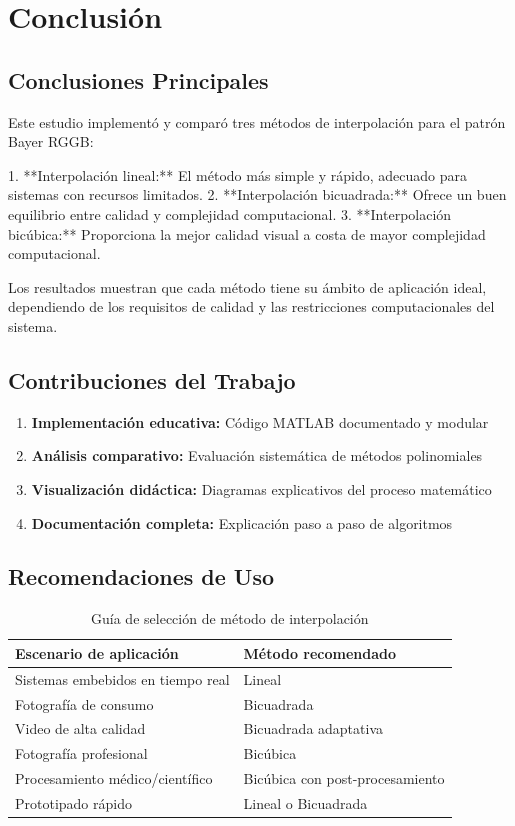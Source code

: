 \section{Conclusión}\label{sec:conclusion}

\subsection{Conclusiones Principales}

Este estudio implementó y comparó tres métodos de interpolación para el patrón Bayer RGGB:

1. **Interpolación lineal:** El método más simple y rápido, adecuado para sistemas con recursos limitados.
2. **Interpolación bicuadrada:** Ofrece un buen equilibrio entre calidad y complejidad computacional.
3. **Interpolación bicúbica:** Proporciona la mejor calidad visual a costa de mayor complejidad computacional.

Los resultados muestran que cada método tiene su ámbito de aplicación ideal, dependiendo de los requisitos de calidad y las restricciones computacionales del sistema.

\subsection{Contribuciones del Trabajo}

\begin{enumerate}
    \item \textbf{Implementación educativa:} Código MATLAB documentado y modular
    \item \textbf{Análisis comparativo:} Evaluación sistemática de métodos polinomiales
    \item \textbf{Visualización didáctica:} Diagramas explicativos del proceso matemático
    \item \textbf{Documentación completa:} Explicación paso a paso de algoritmos
\end{enumerate}

\subsection{Recomendaciones de Uso}

\begin{table}[h]
\centering
\caption{Guía de selección de método de interpolación}
\begin{tabular}{p{4cm}p{6cm}}
\hline
\textbf{Escenario de aplicación} & \textbf{Método recomendado} \\
\hline
Sistemas embebidos en tiempo real & Lineal \\
Fotografía de consumo & Bicuadrada \\
Video de alta calidad & Bicuadrada adaptativa \\
Fotografía profesional & Bicúbica \\
Procesamiento médico/científico & Bicúbica con post-procesamiento \\
Prototipado rápido & Lineal o Bicuadrada \\
\hline
\end{tabular}
\end{table}

